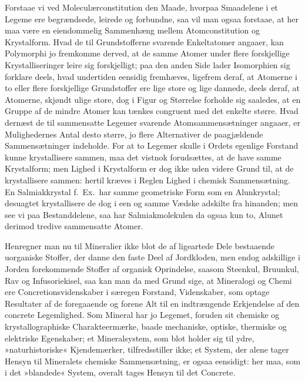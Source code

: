 \documentclass[12pt]{book}
\newcommand{\apage}[1]{\marginnote{\footnotesize\textit{[#1]}}}
\begin{document}
Forstaae vi ved Moleculærconstitution den Maade, hvorpaa Smaadelene i et
Legeme ere begrændsede, leirede og forbundne, saa vil man ogsaa forstaae,
at her maa være en eiendommelig Sammenhæng mellem Atomconstitution og
Krystalform. Hvad de til Grundstofferne svarende Enkeltatomer angaaer, kan
Polymorphi jo fremkomme derved, at de samme Atomer under flere forskjellige
Krystalliseringer leire sig forskjelligt; paa den anden Side lader
Isomorphien sig forklare deels, hvad undertiden eensidig fremhæves,
ligefrem deraf, at Atomerne i to eller flere forskjellige Grundstoffer ere
lige store og lige dannede, deels deraf, at Atomerne, skjøndt ulige store,
dog i Figur og Størrelse forholde sig saaledes, at en Gruppe af de mindre
Atomer kan tænkes congruent med det enkelte større. Hvad dernæst de til
sammensatte Legemer svarende Atomsammensætninger angaaer, er Mulighedernes
Antal desto større, jo flere Alternativer de paagjældende Sammensætninger
indeholde. For at to Legemer skulle i Ordets egenlige Forstand kunne
krystallisere sammen, maa det vistnok forudsættes, at de \apage{158} have samme
Krystalform; men Lighed i Krystalform er dog ikke uden videre Grund til, at
de krystallisere sammen: hertil kræves i Reglen Lighed i chemisk
Sammensætning. En Salmiakkrystal f.\ Ex.\ har samme geometriske Form som en
Alunkrystal; desuagtet krystallisere de dog i een og samme Vædske adskilte
fra hinanden; men see vi paa Bestanddelene, saa har Salmiakmolekulen da
ogsaa kun to, Alunet derimod tredive sammensatte Atomer.

Henregner man nu til Mineralier ikke blot de af ligeartede Dele bestaaende
uorganiske Stoffer, der danne den faste Deel af Jordkloden, men endog
adskillige i Jorden forekommende Stoffer af organisk Oprindelse, saasom
Steenkul, Bruunkul, Rav og Infusoriekisel, saa kan man da med Grund sige,
at Mineralogi og Chemi ere Concretionsvidenskaber i særegen Forstand,
Videnskaber, som optage Resultater af de foregaaende og forene Alt til en
indtrængende Erkjendelse af den concrete Legemlighed. Som Mineral har jo
Legemet, foruden sit chemiske og krystallographiske Charakteermærke, baade
mechaniske, optiske, thermiske og elektriske Egenskaber; et Mineralsystem,
som blot holder sig til ydre, »naturhistoriske« Kjendemærker,
tilfredsstiller ikke; et System, der alene tager Hensyn til Mineralets
chemiske Sammensætning, er ogsaa eensidigt: her maa, som i det »blandede«
System, overalt tages Hensyn til det Concrete.
\end{document}
